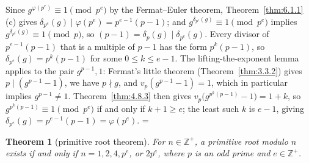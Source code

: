 \documentclass[11pt]{article}
\makeatletter
\let\nt@closedisplay\]
\def\nt@guardedclose{\@ifnextchar\par{\nt@closeafterpar}{\@ifnextchar\end{\postdisplaypenalty\@M\nt@closedisplay}{\nt@closedisplay}}}
\def\nt@closeafterpar\par{\@ifnextchar\par{\nt@closeafterpar}{\@ifnextchar\end{\postdisplaypenalty\@M\nt@closedisplay\par}{\nt@closedisplay\par}}}
\renewenvironment{proof}[1][\proofname]{\par
  \pushQED{\qed}\normalfont\topsep\medskipamount\edef\nt@afterproof{\@endparpenalty=\the\@endparpenalty\relax}\@beginparpenalty\@M\@endparpenalty\@M\let\]\nt@guardedclose\trivlist\item[]\textit{#1\@addpunct{.}} \ignorespaces}{\ifvmode\addpenalty\@M\fi\popQED\nt@afterproof\endtrivlist\@endpefalse}
\theoremstyle{ntstyle}
\newtheorem{theorem}{Theorem}[subsection]
\makeatother
\begin{document}
\begin{proof} Since $g^{\varphi(p^e)}\equiv1\pmod{p^e}$ by the
  Fermat--Euler theorem, Theorem~\ref{thm:6.1.1}(c) gives
  $\delta_{p^e}(g)\mid\varphi(p^e)=p^{e-1}(p-1)$; and
  $g^{\delta_{p^e}(g)}\equiv1\pmod{p^e}$ implies
  $g^{\delta_{p^e}(g)}\equiv1\pmod{p}$, so
  $(p-1)=\delta_p(g)\mid\delta_{p^e}(g)$. Every divisor of $p^{e-1}(p-1)$ that
  is a multiple of $p-1$ has the form $p^{k}(p-1)$, so
  $\delta_{p^e}(g)=p^{k}(p-1)$ for some $0\le k\le e-1$. The lifting-the-exponent lemma applies to the pair
  $g^{p-1},1$: Fermat's little
  theorem (Theorem~\ref{thm:3.3.2}) gives $p\mid(g^{p-1}-1)$, we have
  $p\nmid g$, and $v_p(g^{p-1}-1)=1$, which in particular implies $g^{p-1}\neq1$. Theorem~\ref{thm:4.8.3} then
  gives $v_p\big(g^{p^{k}(p-1)}-1\big)=1+k$, so
  $g^{p^{k}(p-1)}\equiv1\pmod{p^e}$ if and only if $k+1\ge e$; the least such
  $k$ is $e-1$, giving $\delta_{p^e}(g)=p^{e-1}(p-1)=\varphi(p^e)$.
\end{proof}

\begin{theorem}[primitive root theorem]\label{thm:6.2.6}\label{thm:primitive-root-classification}
  For $n \in \mathbb{Z}^+$, a primitive root modulo $n$ exists if and
  only if $n = 1, 2, 4, p^{e}$, or $2 p^{e}$, where $p$ is an odd prime and $e \in \mathbb{Z}^+$.

\end{theorem}
\end{document}
